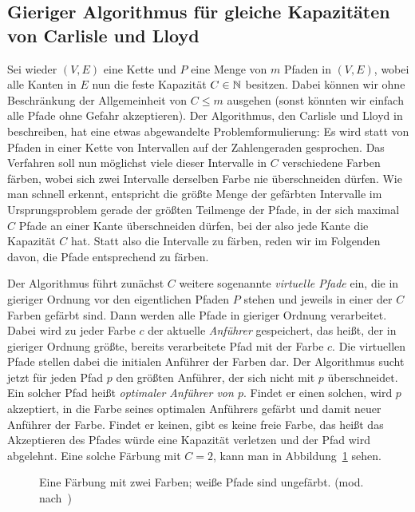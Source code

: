 \subsection{Gieriger Algorithmus für gleiche Kapazitäten von Carlisle und Lloyd}\label{subsec:algorithmusGleicheKapazitäten}
Sei wieder $(V,E)$ eine Kette und $P$ eine Menge von $m$ Pfaden in $(V,E)$, wobei alle Kanten in $E$ nun die
feste Kapazität $C \in \mathbb N$ besitzen.
Dabei können wir ohne Beschränkung der Allgemeinheit von $C \leq m$ ausgehen (sonst könnten wir einfach alle Pfade ohne Gefahr
akzeptieren).
Der Algorithmus, den Carlisle und Lloyd in~\cite{carlisle} beschreiben, hat eine etwas abgewandelte Problemformulierung:
Es wird statt von Pfaden in einer Kette von Intervallen auf der Zahlengeraden gesprochen.
Das Verfahren soll nun möglichst viele dieser Intervalle in $C$ verschiedene Farben färben, wobei sich zwei Intervalle derselben
Farbe nie überschneiden dürfen.
Wie man schnell erkennt, entspricht die größte Menge der gefärbten Intervalle im Ursprungsproblem gerade der größten Teilmenge der Pfade,
in der sich maximal $C$ Pfade an einer Kante überschneiden dürfen, bei der also jede Kante die Kapazität $C$ hat.
Statt also die Intervalle zu färben, reden wir im Folgenden davon, die Pfade entsprechend zu färben.

Der Algorithmus führt zunächst $C$ weitere sogenannte {\em virtuelle Pfade} ein, die in gieriger Ordnung
vor den eigentlichen Pfaden $P$ stehen und jeweils in einer der $C$ Farben gefärbt sind.
Dann werden alle Pfade in gieriger Ordnung verarbeitet.
Dabei wird zu jeder Farbe $c$ der aktuelle {\em Anführer} gespeichert, das heißt, der in gieriger Ordnung größte, bereits
verarbeitete Pfad mit der Farbe $c$.
Die virtuellen Pfade stellen dabei die initialen Anführer der Farben dar.
Der Algorithmus sucht jetzt für jeden Pfad $p$ den größten Anführer, der sich nicht mit $p$ überschneidet.
Ein solcher Pfad heißt {\em optimaler Anführer von $p$}.
Findet er einen solchen, wird $p$ akzeptiert, in die Farbe seines optimalen Anführers gefärbt und damit neuer Anführer
der Farbe.
Findet er keinen, gibt es keine freie Farbe, das heißt das Akzeptieren des Pfades würde eine Kapazität verletzen und der
Pfad wird abgelehnt.
Eine solche Färbung mit $C = 2$, kann man in Abbildung~\ref{fig:k-coloring} sehen.

\begin{figure}[htbp]
	\centering
	\def\svgwidth{250bp}
	
	\caption{Eine Färbung mit zwei Farben; weiße Pfade sind ungefärbt. (mod. nach~\cite{paper})}
	\label{fig:k-coloring}
\end{figure}

